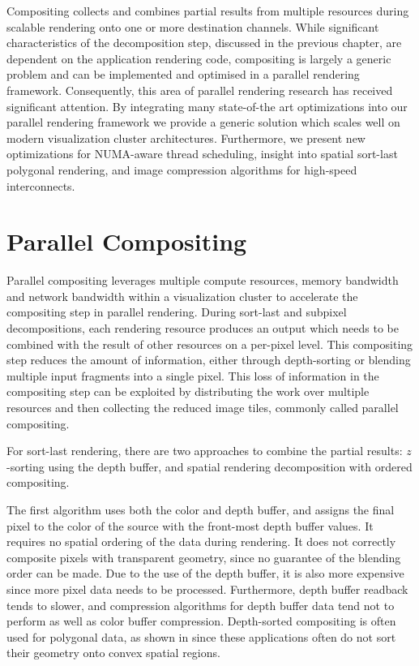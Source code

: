 Compositing collects and combines partial results from multiple resources
during scalable rendering onto one or more destination channels. While
significant characteristics of the decomposition step, discussed in the
previous chapter, are dependent on the application rendering code, compositing
is largely a generic problem and can be implemented and optimised in a parallel
rendering framework. Consequently, this area of parallel rendering research has
received significant attention. By integrating many state-of-the art
optimizations into our parallel rendering framework we provide a generic
solution which scales well on modern visualization cluster architectures.
Furthermore, we present new optimizations for NUMA-aware thread scheduling,
insight into spatial sort-last polygonal rendering, and image compression
algorithms for high-speed interconnects.

\section{Parallel Compositing\label{sparcomp}}

Parallel compositing leverages multiple compute resources, memory bandwidth and
network bandwidth within a visualization cluster to accelerate the compositing
step in parallel rendering. During sort-last and subpixel decompositions, each
rendering resource produces an output which needs to be combined with the
result of other resources on a per-pixel level. This compositing step reduces
the amount of information, either through depth-sorting or blending multiple
input fragments into a single pixel. This loss of information in the
compositing step can be exploited by distributing the work over multiple
resources and then collecting the reduced image tiles, commonly called parallel
compositing.

For sort-last rendering, there are two approaches to combine the partial
results: $z$-sorting using the depth buffer, and spatial rendering
decomposition with ordered compositing.

The first algorithm uses both the color and depth buffer, and assigns the final
pixel to the color of the source with the front-most depth buffer values. It
requires no spatial ordering of the data during rendering. It does not
correctly composite pixels with transparent geometry, since no guarantee of the
blending order can be made. Due to the use of the depth buffer, it is also more
expensive since more pixel data needs to be processed. Furthermore, depth
buffer readback tends to slower, and compression algorithms for depth buffer
data tend not to perform as well as color buffer compression. Depth-sorted
compositing is often used for polygonal data, as shown in  since
these applications often do not sort their geometry onto convex spatial
regions.

